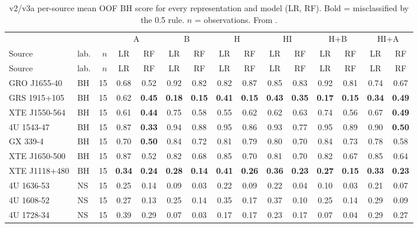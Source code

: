 {\scriptsize\setlength{\tabcolsep}{2.4pt}
\begin{longtable}{@{}llr*{12}{c}@{}}
\caption[v2 per-source scores]{v2/v3a per-source mean OOF BH score for every representation and model (LR, RF). Bold =
misclassified by the 0.5 rule. $n$ = observations. From .}\label{tab:p1v2persource}\\
\toprule
 & & & \multicolumn{2}{c}{A} & \multicolumn{2}{c}{B} & \multicolumn{2}{c}{H} & \multicolumn{2}{c}{HI} & \multicolumn{2}{c}{H+B} & \multicolumn{2}{c}{HI+A}\\
Source & lab. & $n$ & LR & RF & LR & RF & LR & RF & LR & RF & LR & RF & LR & RF \\
\midrule\endfirsthead
\toprule Source & lab. & $n$ & LR & RF & LR & RF & LR & RF & LR & RF & LR & RF & LR & RF \\ \midrule\endhead
\bottomrule\endfoot
GRO J1655-40 & BH & 15 & 0.68 & 0.52 & 0.92 & 0.82 & 0.82 & 0.87 & 0.85 & 0.83 & 0.92 & 0.81 & 0.74 & 0.67 \\
GRS 1915+105 & BH & 15 & 0.62 & \textbf{0.45} & \textbf{0.18} & \textbf{0.15} & \textbf{0.41} & \textbf{0.15} & \textbf{0.43} & \textbf{0.35} & \textbf{0.17} & \textbf{0.15} & \textbf{0.34} & \textbf{0.49} \\
XTE J1550-564 & BH & 15 & 0.61 & \textbf{0.44} & 0.75 & 0.58 & 0.55 & 0.62 & 0.62 & 0.63 & 0.74 & 0.56 & 0.67 & \textbf{0.49} \\
4U 1543-47 & BH & 15 & 0.87 & \textbf{0.33} & 0.94 & 0.88 & 0.95 & 0.86 & 0.93 & 0.77 & 0.95 & 0.89 & 0.90 & \textbf{0.50} \\
GX 339-4 & BH & 15 & 0.70 & \textbf{0.50} & 0.84 & 0.72 & 0.81 & 0.79 & 0.80 & 0.70 & 0.84 & 0.73 & 0.78 & 0.58 \\
XTE J1650-500 & BH & 15 & 0.87 & 0.52 & 0.82 & 0.68 & 0.85 & 0.70 & 0.81 & 0.70 & 0.82 & 0.67 & 0.85 & 0.64 \\
XTE J1118+480 & BH & 15 & \textbf{0.34} & \textbf{0.24} & \textbf{0.28} & \textbf{0.14} & \textbf{0.41} & \textbf{0.26} & \textbf{0.36} & \textbf{0.23} & \textbf{0.27} & \textbf{0.15} & \textbf{0.33} & \textbf{0.23} \\
4U 1636-53 & NS & 15 & 0.25 & 0.14 & 0.09 & 0.03 & 0.22 & 0.09 & 0.22 & 0.04 & 0.10 & 0.03 & 0.21 & 0.07 \\
4U 1608-52 & NS & 15 & 0.27 & 0.13 & 0.25 & 0.14 & 0.35 & 0.17 & 0.37 & 0.10 & 0.25 & 0.14 & 0.29 & 0.09 \\
4U 1728-34 & NS & 15 & 0.39 & 0.29 & 0.07 & 0.03 & 0.17 & 0.17 & 0.23 & 0.17 & 0.07 & 0.04 & 0.29 & 0.27 \\

\end{longtable}}
